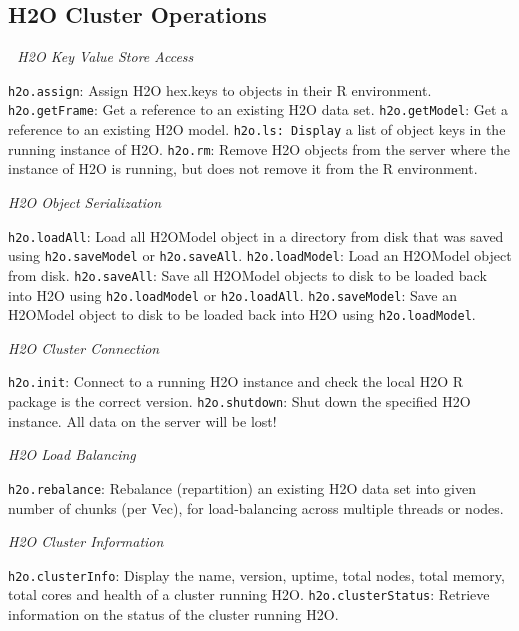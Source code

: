 \documentclass[11pt]{article}
\begin{document}
{{\subsection{H2O Cluster Operations} 
\emph{H2O Key Value Store Access}\par
{\texttt{h2o.assign}}: Assign H2O hex.keys to objects in their R environment.\newline
{\texttt{h2o.getFrame}}: Get a reference to an existing H2O data set. \newline
{\texttt{h2o.getModel}}: Get a reference to an existing H2O model. \newline
{\texttt{h2o.ls: Display}} a list of object keys in the running instance of H2O. \newline
{\texttt{h2o.rm}}: Remove H2O objects from the server where the instance of H2O is running, but does not remove it from the R environment.\newline

\emph{H2O Object Serialization}\par
{\texttt{h2o.loadAll}}: Load all H2OModel object in a directory from disk that was saved using {\texttt{h2o.saveModel}} or {\texttt{h2o.saveAll}}.\newline
{\texttt{h2o.loadModel}}: Load an H2OModel object from disk.\newline
{\texttt{h2o.saveAll}}: Save all H2OModel objects to disk to be loaded back into H2O using {\texttt{h2o.loadModel}} or {\texttt{h2o.loadAll}}.\newline
{\texttt{h2o.saveModel}}: Save an H2OModel object to disk to be loaded back into H2O using {\texttt{h2o.loadModel}}.\newline

\emph{H2O Cluster Connection}\par
{\texttt{h2o.init}}: Connect to a running H2O instance and check the local H2O R package is the correct version.\newline
{\texttt{h2o.shutdown}}: Shut down the specified H2O instance. All data on the server will be lost!\newline

\emph{H2O Load Balancing}\par
{\texttt{h2o.rebalance}}: Rebalance (repartition) an existing H2O data set into given number of chunks (per Vec), for load-balancing across multiple threads or nodes.\newline

\emph{H2O Cluster Information}\par
{\texttt{h2o.clusterInfo}}: Display the name, version, uptime, total nodes, total memory, total cores and health of a cluster running H2O.\newline
{\texttt{h2o.clusterStatus}}: Retrieve information on the status of the cluster running H2O.\newline

}}
\end{document}
